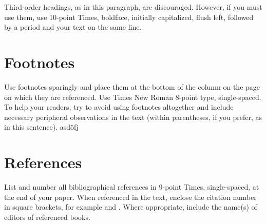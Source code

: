 \documentclass[10pt]{article}
\newcommand{\sansserifformat}[1]{\fontfamily{cmss}{ #1}}%
\begin{document}
Third-order headings, as in this paragraph, are discouraged. However, if you must use them, use 10-point Times, boldface, initially capitalized, flush left, followed by a period and your text on the same line.

\section{Footnotes}

Use footnotes sparingly and place them at the bottom of the column on the page on which they are referenced. Use Times New Roman 8-point type, single-spaced. To help your readers, try to avoid using footnotes altogether and include necessary peripheral observations in the text (within parentheses, if you prefer, as in this sentence).
asdöfj





\section{References}

List and number all bibliographical references in 9-point Times, single-spaced, at the end of your paper. When referenced in the text, enclose the citation number in square brackets, for example \cite{Jones2015,Smith2015} and \cite{Smith2015}. Where appropriate, include the name(s) of editors of referenced books.




\end{document}
